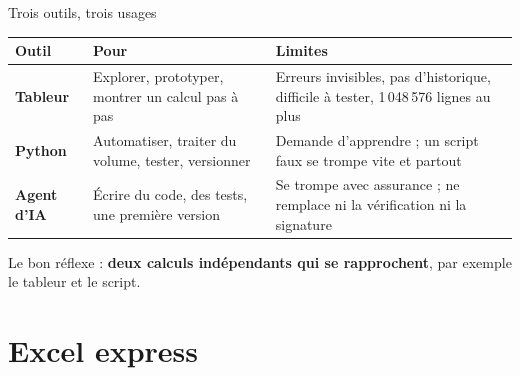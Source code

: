 \documentclass[10pt,aspectratio=169]{beamer}
\begin{document}
\begin{frame}{Trois outils, trois usages}
\begin{table}
\centering
\small
\renewcommand{\arraystretch}{1.5}
\begin{tabular}{p{2.4cm}p{4.6cm}p{5.6cm}}
\toprule
\textbf{Outil} & \textbf{Pour} & \textbf{Limites} \\
\midrule
\textbf{Tableur} & Explorer, prototyper, montrer un calcul pas à pas & Erreurs invisibles, pas d'historique, difficile à tester, 1\,048\,576 lignes au plus \\
\textbf{Python} & Automatiser, traiter du volume, tester, versionner & Demande d'apprendre ; un script faux se trompe vite et partout \\
\textbf{Agent d'IA} & Écrire du code, des tests, une première version & Se trompe avec assurance ; ne remplace ni la vérification ni la signature \\
\bottomrule
\end{tabular}
\end{table}
\begin{center}
\small Le bon réflexe : \textbf{deux calculs indépendants qui se rapprochent}, par exemple le tableur et le script.
\end{center}
\end{frame}

\section{Excel express}
\end{document}
